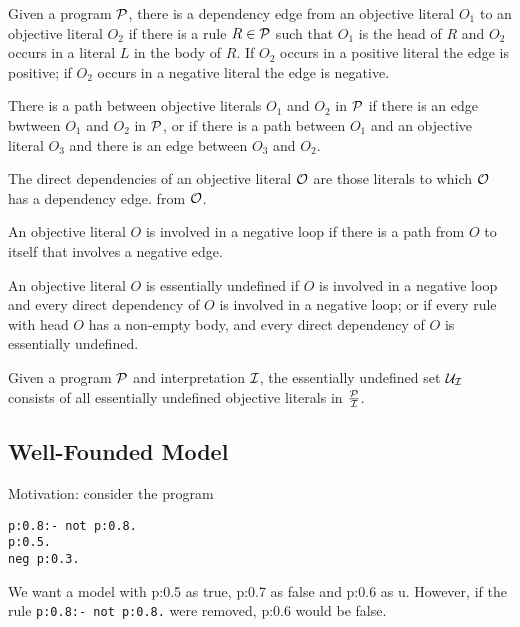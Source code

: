 \begin{definition}
Given a program $\cP$, there is a dependency edge from an objective
literal $O_1$ to an objective literal $O_2$ if there is a rule $R \in
\cP$ such that $O_1$ is the head of $R$ and $O_2$ occurs in a literal
$L$ in the body of $R$.  If $O_2$ occurs in a positive literal the
edge is positive; if $O_2$ occurs in a negative literal the edge is
negative.  

There is a path between objective literals $O_1$ and $O_2$ in $\cP$ if
there is an edge bwtween $O_1$ and $O_2$ in $\cP$, or if there is a
path between $O_1$ and an objective literal $O_3$ and there is an edge
between $O_3$ and $O_2$.

The direct dependencies of an objective literal $\cO$ are those
literals to which $\cO$ has a dependency edge.  
from $\cO$.

An objective literal $O$ is involved in a negative loop if there is a
path from $O$ to itself that involves a negative edge.


An objective literal $O$ is essentially undefined if $O$ is involved
in a negative loop and every direct dependency of $O$ is involved in a
negative loop; or if every rule with head $O$ has a non-empty body,
and every direct dependency of $O$ is essentially undefined.

Given a program $\cP$ and interpretation $\cI$, the essentially
undefined set $\cU_{\cI}$ consists of all essentially undefined
objective literals in $\frac{\cP}{\cI}$.

\end{definition}

\subsection{Well-Founded Model}

Motivation: consider the program
\begin{verbatim}
p:0.8:- not p:0.8.
p:0.5.
neg p:0.3.
\end{verbatim}
We want a model with p:0.5 as true, p:0.7 as false and p:0.6 as u.
However, if the rule {\tt p:0.8:- not p:0.8.} were removed, p:0.6
would be false.

